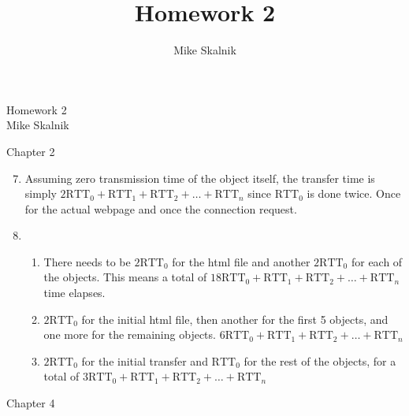 \documentclass[12pt]{article}
\title{Homework 2}
\author{Mike Skalnik}
\newcommand{\s}[1]{\setcounter{enumi}{#1}}
\begin{document}
\begin{flushright}{\large Homework 2\\ Mike Skalnik}\end{flushright}

Chapter 2

\begin{enumerate}
  \s{6}
  \item Assuming zero transmission time of the object itself, the transfer time is simply $2 \mathrm{RTT}_0 + \mathrm{RTT}_1 + \mathrm{RTT}_2 + \dots + \mathrm{RTT}_n$ since $\mathrm{RTT}_0$ is done twice. Once for the actual webpage and once the connection request.

  \item
    \begin{enumerate}
      \item There needs to be $2 \mathrm{RTT}_0$ for the html file and another $2 \mathrm{RTT}_0$ for each of the objects. This means a total of $18 \mathrm{RTT}_0 + \mathrm{RTT}_1 + \mathrm{RTT}_2 + \dots + \mathrm{RTT}_n$ time elapses.
      \item $2 \mathrm{RTT}_0$ for the initial html file, then another for the first 5 objects, and one more for the remaining objects. $6 \mathrm{RTT}_0 + \mathrm{RTT}_1 + \mathrm{RTT}_2 + \dots + \mathrm{RTT}_n$
      \item $2 \mathrm{RTT}_0$ for the initial transfer and $\mathrm{RTT}_0$ for the rest of the objects, for a total of $3 \mathrm{RTT}_0 + \mathrm{RTT}_1 + \mathrm{RTT}_2 + \dots + \mathrm{RTT}_n$
    \end{enumerate}
\end{enumerate}

Chapter 4
\end{document}
